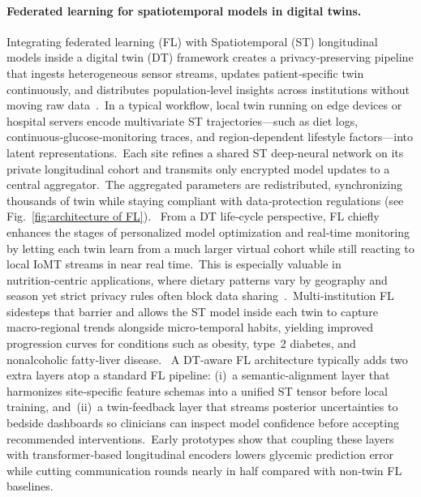 \documentclass[acmsmall]{acmart}
\begin{document}
\paragraph{Federated learning for spatiotemporal models in digital twins.} Integrating federated learning (FL) with Spatiotemporal (ST) longitudinal models inside a digital twin (DT) framework creates a privacy‑preserving pipeline that ingests heterogeneous sensor streams, updates patient‑specific twin continuously, and distributes population‑level insights across institutions without moving raw data \cite{aouedi2022FLmedical}. In a typical workflow, local twin running on edge devices or hospital servers encode multivariate ST trajectories—such as diet logs, continuous‑glucose‑monitoring traces, and region‑dependent lifestyle factors—into latent representations. Each site refines a shared ST deep‑neural network on its private longitudinal cohort and transmits only encrypted model updates to a central aggregator. The aggregated parameters are redistributed, synchronizing thousands of twin while staying compliant with data‑protection regulations (see Fig.~\ref{fig:architecture of FL}).  From a DT life‑cycle perspective, FL chiefly enhances the stages of personalized model optimization and real‑time monitoring by letting each twin learn from a much larger virtual cohort while still reacting to local IoMT streams in near real time. This is especially valuable in nutrition‑centric applications, where dietary patterns vary by geography and season yet strict privacy rules often block data sharing \cite{nguyen2022FLsmarthealthcare}. Multi‑institution FL sidesteps that barrier and allows the ST model inside each twin to capture macro‑regional trends alongside micro‑temporal habits, yielding improved progression curves for conditions such as obesity, type 2 diabetes, and nonalcoholic fatty‑liver disease.  A DT‑aware FL architecture typically adds two extra layers atop a standard FL pipeline: (i) a semantic‑alignment layer that harmonizes site‑specific feature schemas into a unified ST tensor before local training, and (ii) a twin‑feedback layer that streams posterior uncertainties to bedside dashboards so clinicians can inspect model confidence before accepting recommended interventions. Early prototypes show that coupling these layers with transformer‑based longitudinal encoders lowers glycemic prediction error while cutting communication rounds nearly in half compared with non‑twin FL baselines.  
\end{document}
